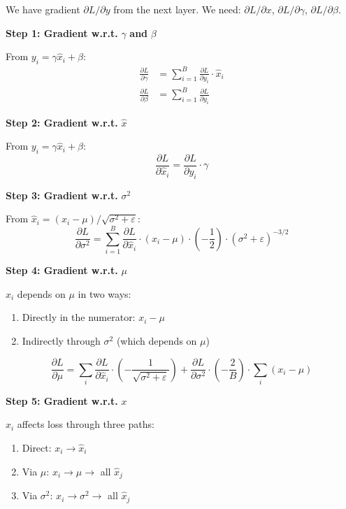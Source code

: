 We have gradient $\partial L/\partial y$ from the next layer. We need: $\partial L/\partial x$, $\partial L/\partial \gamma$, $\partial L/\partial \beta$.

\textbf{Step 1: Gradient w.r.t.} $\gamma$ \textbf{and} $\beta$

From $y_i = \gamma \hat{x}_i + \beta$:
\begin{align*}
\frac{\partial L}{\partial \gamma} &= \sum_{i=1}^B \frac{\partial L}{\partial y_i} \cdot \hat{x}_i \\
\frac{\partial L}{\partial \beta} &= \sum_{i=1}^B \frac{\partial L}{\partial y_i}
\end{align*}

\textbf{Step 2: Gradient w.r.t.} $\hat{x}$

From $y_i = \gamma \hat{x}_i + \beta$:
\[
\frac{\partial L}{\partial \hat{x}_i} = \frac{\partial L}{\partial y_i} \cdot \gamma
\]

\textbf{Step 3: Gradient w.r.t.} $\sigma^2$

From $\hat{x}_i = (x_i - \mu) / \sqrt{\sigma^2 + \varepsilon}$:
\[
\frac{\partial L}{\partial \sigma^2} = \sum_{i=1}^B \frac{\partial L}{\partial \hat{x}_i} \cdot (x_i - \mu) \cdot \left(-\frac{1}{2}\right) \cdot (\sigma^2 + \varepsilon)^{-3/2}
\]

\textbf{Step 4: Gradient w.r.t.} $\mu$

$\hat{x}_i$ depends on $\mu$ in two ways:
\begin{enumerate}
\item Directly in the numerator: $x_i - \mu$
\item Indirectly through $\sigma^2$ (which depends on $\mu$)
\end{enumerate}

\[
\frac{\partial L}{\partial \mu} = \sum_i \frac{\partial L}{\partial \hat{x}_i} \cdot \left(-\frac{1}{\sqrt{\sigma^2 + \varepsilon}}\right) + \frac{\partial L}{\partial \sigma^2} \cdot \left(-\frac{2}{B}\right) \cdot \sum_i (x_i - \mu)
\]

\textbf{Step 5: Gradient w.r.t.} $x$

$x_i$ affects loss through three paths:
\begin{enumerate}
\item Direct: $x_i \to \hat{x}_i$
\item Via $\mu$: $x_i \to \mu \to$ all $\hat{x}_j$
\item Via $\sigma^2$: $x_i \to \sigma^2 \to$ all $\hat{x}_j$
\end{enumerate}

